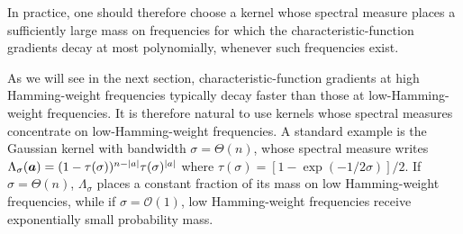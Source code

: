 \documentclass{article}
\theoremstyle{plain}
\theoremstyle{definition}
\newtheorem{definition}[theorem]{Definition}
\theoremstyle{remark}
\newtheorem{remark}[theorem]{Remark}
\begin{document}
In practice, one should therefore choose a kernel whose spectral measure places a sufficiently large mass on frequencies for which the characteristic-function gradients decay at most polynomially, whenever such frequencies exist. 


As we will see in the next section, characteristic-function gradients at high Hamming-weight frequencies typically decay faster than those at low-Hamming-weight frequencies. It is therefore natural to use kernels whose spectral measures concentrate on low-Hamming-weight frequencies. A standard example is the Gaussian kernel with bandwidth $\sigma=\Theta(n)$, whose spectral measure writes $\Lambda_\sigma({\bm{a}}) = (1-\tau(\sigma))^{n-\abs{a}} \tau(\sigma)^\abs{a}$ where $\tau(\sigma) = [1-\exp(-1/2 \sigma)]/2$. If $\sigma=\Theta(n)$, $\Lambda_\sigma$ places a constant fraction of its mass on low Hamming-weight frequencies, while if $\sigma=\mathcal{O}(1)$, low Hamming-weight frequencies receive exponentially small probability mass.
\end{document}
